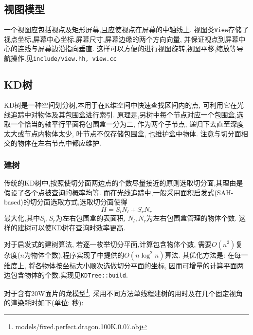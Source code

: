 \subsection{视图模型}
一个视图应包括视点及矩形屏幕,且应使视点在屏幕的中轴线上.
视图类\verb|View|存储了视点坐标,屏幕中心坐标,屏幕尺寸,屏幕边缘的两个方向向量,
并保证视点到屏幕中心的连线与屏幕边沿指向垂直.
这样可以方便的进行视图旋转,视图平移,缩放等导航操作.见\verb|include/view.hh, view.cc|

\subsection{KD树}
KD树是一种空间划分树,本用于在K维空间中快速查找区间内的点, 可利用它在光线追踪中对物体及其包围盒进行索引.
原理是,另树中每个节点对应一个包围盒,选取一个恰当的轴平行平面将包围盒一分为二, 作为两个子节点,
递归下去直至深度太大或节点内物体太少, 叶节点不仅存储包围盒, 也维护盒中物体.
注意与切分面相交的物体在左右节点中都应维护.

\subsubsection{建树}
传统的KD树中,按照使切分面两边点的个数尽量接近的原则选取切分面,其理由是假设了各个点被查询的概率均等.
而在光线追踪中,一般采用面积启发式(SAH-based)的切分面选取方式\cite{kdtree},选取切分面使得
\[ H = S_l N_l + S_r N_r \]
最大化,其中$ S_l, S_r$为左右包围盒的表面积, $ N_l, N_r$为左右包围盒管理的物体个数.
这样的建树可以使KD树在查询时效率更高.

对于启发式的建树算法, 若逐一枚举切分平面,计算包含物体个数,
需要$ O(n^2)$复杂度($n$为物体个数),程序实现了\cite{kdtree}中提供的$ O(n \log^2 n)$算法.
其优化方法是: 在每一维度上, 将各物体按坐标大小顺次选做切分平面的坐标,
因而可增量的计算平面两边包含物体的个数.实现见\verb|KDTree::build|.

对于含有20W面片的龙模型\footnote{models/fixed.perfect.dragon.100K.0.07.obj},
采用不同方法单线程建树的用时及在几个固定视角的渲染耗时如下(单位: 秒):

